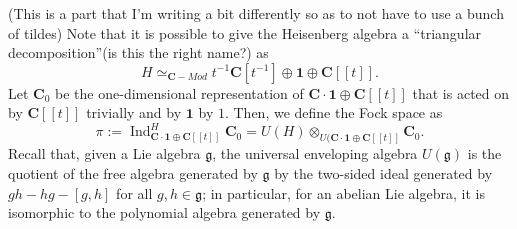 \documentclass{article}
\newcommand{\CC}{\mathbold{C}}
\newcommand{\one}{\mathbold{1}}
\newcommand{\gf}{\mathfrak{g}}
\DeclareMathOperator{\Ind}{Ind}
\begin{document}
(This is a part that I'm writing a bit differently so as to not have to use a bunch of tildes)
Note that it is possible to give the Heisenberg algebra a ``triangular decomposition''(is this the right name?) as 
\[H \simeq_{\CC-Mod} t^{-1}\CC[t^{-1}] \oplus \one \oplus \CC[[t]].  \]
Let $\CC_0$ be the one-dimensional representation of $\CC \cdot\one \oplus \CC[[t]]$ that is acted on by $\CC[[t]]$ trivially and by $\one$ by $1$.  Then, we define the Fock space as
\[\pi:=\Ind_{\CC \cdot \one \oplus \CC[[t]]}^H\CC_0=U(H) \otimes_{U(\CC \cdot \one \oplus \CC[[t]]}\CC_0. \]
Recall that, given a Lie algebra $\gf$, the universal enveloping algebra $U(\gf)$ is the quotient of the free algebra generated by $\gf$ by the two-sided ideal generated by $gh-hg-[g,h]$ for all $g,h \in \gf$; in particular, for an abelian Lie algebra, it is isomorphic to the polynomial algebra generated by $\gf$.
\end{document}
